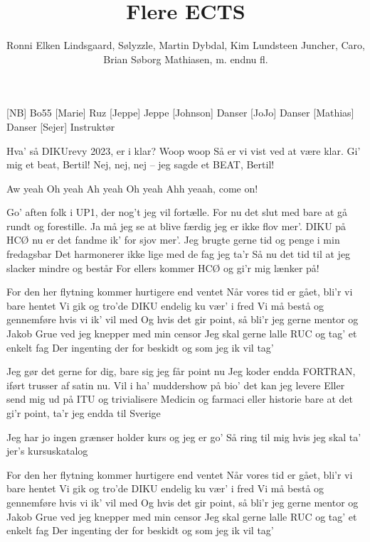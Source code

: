 \documentclass[a4paper,11pt]{article}
\title{Flere ECTS}
\author{Ronni Elken Lindsgaard, Sølyzzle, Martin Dybdal, Kim Lundsteen Juncher, Caro, Brian Søborg Mathiasen, m. endnu fl.}
\begin{document}
 \maketitle

 \begin{roles}
   [NB] Bo55
   [Marie] Ruz
   [Jeppe] Jeppe
   [Johnson] Danser
   [JoJo] Danser
   [Mathias] Danser
   [Sejer] Instruktør
 \end{roles}

\begin{song}
 Hva' så DIKUrevy 2023, er i klar?
 Woop woop
 Så er vi vist ved at være klar. Gi' mig et beat, Bertil!
 Nej, nej, nej -- jeg sagde et BEAT, Bertil!

 Aw yeah
 Oh yeah
 Ah yeah
 Oh yeah
 Ahh yeaah, come on!

 Go' aften folk i UP1, der nog't jeg vil fortælle.
For nu det slut med bare at gå rundt og forestille.
Ja må jeg se at blive færdig jeg er ikke flov mer'.
DIKU på HCØ nu er det fandme ik' for sjov mer'.
Jeg brugte gerne tid og penge i min fredagsbar
Det harmonerer ikke lige med de fag jeg ta'r
Så nu det tid til at jeg slacker mindre og består
For ellers kommer HCØ og gi'r mig lænker på!

 For den her flytning kommer hurtigere end ventet
Når vores tid er gået, bli'r vi bare hentet
Vi gik og tro'de DIKU endelig ku vær' i fred
Vi må bestå og gennemføre hvis vi ik' vil med
 Og hvis det gir point, så bli'r jeg gerne mentor
og Jakob Grue ved jeg knepper med min censor
 Jeg skal gerne lalle RUC og tag' et enkelt fag
Der ingenting der for beskidt og som jeg ik vil tag'

Jeg gør det gerne for dig, bare sig jeg får point nu
Jeg koder endda FORTRAN, iført trusser af satin nu.
Vil i ha' muddershow på bio' det kan jeg levere
Eller send mig ud på ITU og trivialisere
Medicin og farmaci eller  historie
bare at det gi'r point, ta'r jeg endda til Sverige

Jeg har jo ingen grænser holder kurs og jeg er go'
Så ring til mig hvis jeg skal ta' jer's kursuskatalog

 For den her flytning kommer hurtigere end ventet
Når vores tid er gået, bli'r vi bare hentet
Vi gik og tro'de DIKU endelig ku vær' i fred
Vi må bestå og gennemføre hvis vi ik' vil med
 Og hvis det gir point, så bli'r jeg gerne mentor
og Jakob Grue ved jeg knepper med min censor
 Jeg skal gerne lalle RUC og tag' et enkelt fag
Der ingenting der for beskidt og som jeg ik vil tag'


\end{song}
\end{document}

